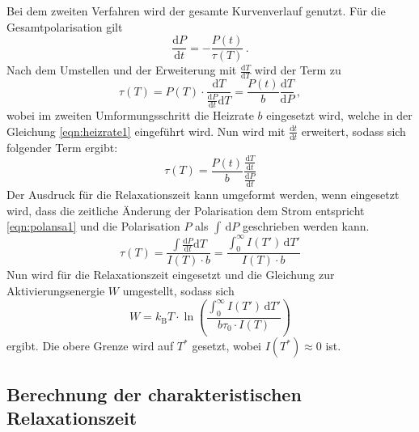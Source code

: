         \noindent Bei dem zweiten Verfahren wird der gesamte Kurvenverlauf genutzt. Für die Gesamtpolarisation gilt 
        \begin{equation*}
            \frac{\text{d}P}{\text{d}t} = -\frac{P(t)}{\tau(T)}\, .
        \end{equation*}
        Nach dem Umstellen und der Erweiterung mit $\frac{\text{d}T}{\text{d}T}$ wird der Term zu 
        \begin{equation*}
            \tau(T) = P(T) \cdot \frac{\text{d}T}{\frac{\text{d}P}{\text{d}t}\text{d}T } =  \frac{P(t)}{b} \frac{\text{d}T}{\text{d}P}\, ,
        \end{equation*}
        wobei im zweiten Umformungsschritt die Heizrate $b$ eingesetzt wird, welche in der Gleichung \eqref{eqn:heizrate1} eingeführt wird. 
        Nun wird mit $\frac{\text{d}t}{\text{d}t}$ erweitert, sodass sich folgender Term ergibt:
        \begin{equation*}
            \tau(T) = \frac{P(t)}{b} \frac{\frac{\text{d}T}{\text{d}t}}{\frac{\text{d}P}{\text{d}t}}
        \end{equation*}
        Der Ausdruck für die Relaxationszeit kann umgeformt werden, wenn eingesetzt wird, dass die zeitliche Änderung der Polarisation dem Strom entspricht \eqref{eqn:polansa1} 
        und die Polarisation $P$ als $\int \, \text{d}P$ geschrieben werden kann. 
        \begin{equation*}
            \tau(T) = \frac{\int \frac{\text{d}P}{\text{d}t} \text{d}T}{I(T) \cdot b} = \frac{\int_0^\infty I(T') \, \text{d}T'}{I(T) \cdot b}
        \end{equation*}
        Nun wird für die Relaxationszeit eingesetzt und die Gleichung zur Aktivierungsenergie $W$ umgestellt, sodass sich
        \begin{equation}
            W = k_\text{B} T \cdot \ln\left( \frac{\int_0^\infty I(T') \, \text{d}T'}{b \tau_0 \cdot I(T)}\right)
        \end{equation}
        ergibt. Die obere Grenze wird auf $T^*$ gesetzt, wobei $I(T^*) \approx 0$ ist. 


    \subsection{Berechnung der charakteristischen Relaxationszeit}

